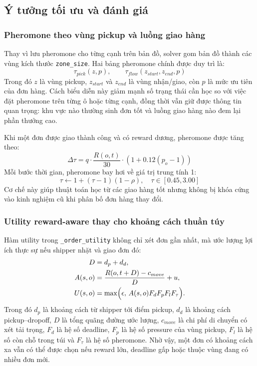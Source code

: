 \documentclass[conference]{IEEEtran}
\begin{document}
\subsection{Ý tưởng tối ưu và đánh giá}
\subsubsection{Pheromone theo vùng pickup và luồng giao hàng}
Thay vì lưu pheromone cho từng cạnh trên bản đồ, solver gom bản đồ thành các vùng kích thước \texttt{zone\_size}. Hai bảng pheromone chính được duy trì là:
\begin{equation}
\tau_{pick}(z, p), \qquad
\tau_{flow}(z_{start}, z_{end}, p)
\end{equation}
Trong đó $z$ là vùng pickup, $z_{start}$ và $z_{end}$ là vùng nhận/giao, còn $p$ là mức ưu tiên của đơn hàng. Cách biểu diễn này giảm mạnh số trạng thái cần học so với việc đặt pheromone trên từng ô hoặc từng cạnh, đồng thời vẫn giữ được thông tin quan trọng: khu vực nào thường sinh đơn tốt và luồng giao hàng nào đem lại phần thưởng cao.

Khi một đơn được giao thành công và có reward dương, pheromone được tăng theo:
\begin{equation}
\Delta \tau =
q \cdot \frac{R(o,t)}{30}
\cdot \left(1 + 0.12(p_o - 1)\right)
\end{equation}
Mỗi bước thời gian, pheromone bay hơi về giá trị trung tính 1:
\begin{equation}
\tau \leftarrow 1 + (\tau - 1)(1-\rho),
\quad
\tau \in [0.45, 3.00]
\end{equation}
Cơ chế này giúp thuật toán học từ các giao hàng tốt nhưng không bị khóa cứng vào kinh nghiệm cũ khi phân bố đơn hàng thay đổi.

\subsubsection{Utility reward-aware thay cho khoảng cách thuần túy}
Hàm utility trong \texttt{\_order\_utility} không chỉ xét đơn gần nhất, mà ước lượng lợi ích thực sự nếu shipper nhặt và giao đơn đó:
\begin{equation}
\begin{aligned}
D &= d_p + d_d,\\
A(s,o) &= \frac{R(o,t+D)-c_{move}}{D} + u,\\
U(s,o) &= \max\Bigl(\epsilon,\,
A(s,o)F_dF_pF_lF_{\tau}\Bigr).
\end{aligned}
\end{equation}
Trong đó $d_p$ là khoảng cách từ shipper tới điểm pickup, $d_d$ là khoảng cách pickup--dropoff, $D$ là tổng quãng đường ước lượng, $c_{move}$ là chi phí di chuyển có xét tải trọng, $F_d$ là hệ số deadline, $F_p$ là hệ số pressure của vùng pickup, $F_l$ là hệ số còn chỗ trong túi và $F_{\tau}$ là hệ số pheromone. Nhờ vậy, một đơn có khoảng cách xa vẫn có thể được chọn nếu reward lớn, deadline gấp hoặc thuộc vùng đang có nhiều đơn mới.
\end{document}
